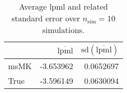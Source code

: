 \begin{table}[H]

\caption{Average lpml and related standard error over $n_{\text{sim}} = 10$ simulations.}
\centering
\begin{tabular}[t]{lrr}
\toprule
  & $\overbar{\text{lpml}}$ & $\text{sd}(\overbar{\text{lpml}})$\\
\midrule
msMK & -3.653962 & 0.0652697\\
True & -3.596149 & 0.0630094\\
\bottomrule
\end{tabular}
\end{table}